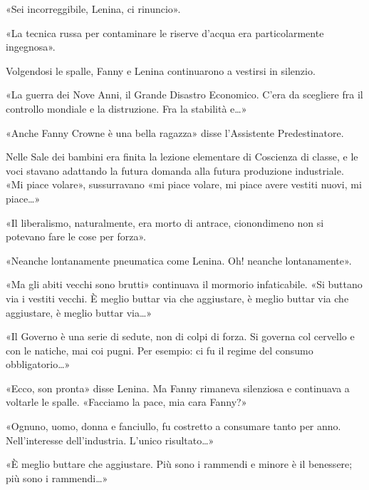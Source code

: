 \documentclass[
a5paper, %
10pt, %
twoside, 
onecolumn, %
openany, %
]{memoir}
\renewenvironment{shaded}{%
  \def\FrameCommand{\fboxsep=\FrameSep \colorbox{shadecolor}}%
  \MakeFramed{\advance\hsize-\width \FrameRestore\FrameRestore}}%
 {\endMakeFramed}
\begin{document}
\begin{shaded}
    «Sei incorreggibile, Lenina, ci rinuncio».
\end{shaded}

«La tecnica russa per contaminare le riserve d’acqua era particolarmente ingegnosa».

\begin{shaded}
    Volgendosi le spalle, Fanny e Lenina continuarono a vestirsi in silenzio.
\end{shaded}

«La guerra dei Nove Anni, il Grande Disastro Economico. C’era da scegliere fra il controllo mondiale e la distruzione. Fra la stabilità e…»

\begin{shaded}
    «Anche Fanny Crowne è una bella ragazza» disse l’Assistente Predestinatore.
\end{shaded}

Nelle Sale dei bambini era finita la lezione elementare di Coscienza di classe, e le voci stavano adattando la futura domanda alla futura produzione industriale. «Mi piace volare», sussurravano «mi piace volare, mi piace avere vestiti nuovi, mi piace…»

«Il liberalismo, naturalmente, era morto di antrace, cionondimeno non si potevano fare le cose per forza».

\begin{shaded}
    «Neanche lontanamente pneumatica come Lenina. Oh! neanche lontanamente».
\end{shaded}

«Ma gli abiti vecchi sono brutti» continuava il mormorio infaticabile. «Si buttano via i vestiti vecchi. È meglio buttar via che aggiustare, è meglio buttar via che aggiustare, è meglio buttar via…»

«Il Governo è una serie di sedute, non di colpi di forza. Si governa col cervello e con le natiche, mai coi pugni. Per esempio: ci fu il regime del consumo obbligatorio…»

\begin{shaded}
    «Ecco, son pronta» disse Lenina. Ma Fanny rimaneva silenziosa e continuava a voltarle le spalle. «Facciamo la pace, mia cara Fanny?»
\end{shaded}

«Ognuno, uomo, donna e fanciullo, fu costretto a consumare tanto per anno. Nell’interesse dell’industria. L’unico risultato…»

«È meglio buttare che aggiustare. Più sono i rammendi e minore è il benessere; più sono i rammendi…»
\end{document}
